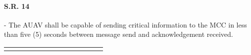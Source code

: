 \begin{fullwidth}
\begin{landscape}
    \newpage
    
    
    \paragraph{S.R. 14} - The AUAV shall be capable of sending critical information to the MCC in less than five (5) seconds between message send and acknowledgement received.
    
    {\fontsize{10pt}{11pt}\selectfont
    \begin{longtable}{| L{0.12\linewidth} | L{0.16\linewidth} |  L{0.20\linewidth} | L{0.08\linewidth} | L{0.20\linewidth} | L{0.08\linewidth} |}
        \hline \endlastfoot
        

\end{longtable}}
\end{landscape}
\end{fullwidth}
